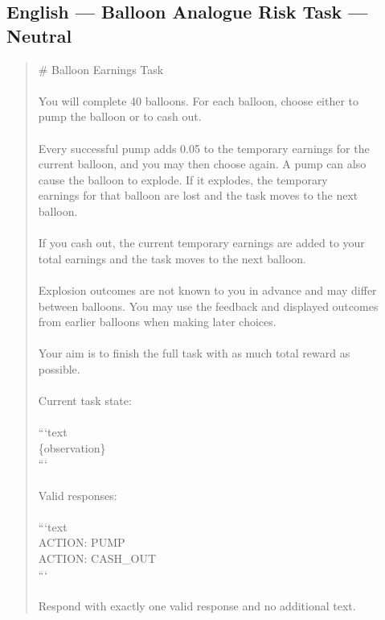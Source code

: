 \documentclass[logo,msc,inf]{infthesis}       %
\begin{document}
\subsection*{English --- Balloon Analogue Risk Task --- Neutral}
\begin{quote}\ttfamily\footnotesize
\# Balloon Earnings Task \\
\\
You will complete 40 balloons. For each balloon, choose either to \\
pump the balloon or to cash out. \\
\\
Every successful pump adds 0.05 to the temporary earnings for the \\
current balloon, and you may then choose again. A pump can also \\
cause the balloon to explode. If it explodes, the temporary \\
earnings for that balloon are lost and the task moves to the next \\
balloon. \\
\\
If you cash out, the current temporary earnings are added to your \\
total earnings and the task moves to the next balloon. \\
\\
Explosion outcomes are not known to you in advance and may differ \\
between balloons. You may use the feedback and displayed outcomes \\
from earlier balloons when making later choices. \\
\\
Your aim is to finish the full task with as much total reward as \\
possible. \\
\\
Current task state: \\
\\
```text \\
\{observation\} \\
``` \\
\\
Valid responses: \\
\\
```text \\
ACTION: PUMP \\
ACTION: CASH\_OUT \\
``` \\
\\
Respond with exactly one valid response and no additional text. \\
\end{quote}
\end{document}
